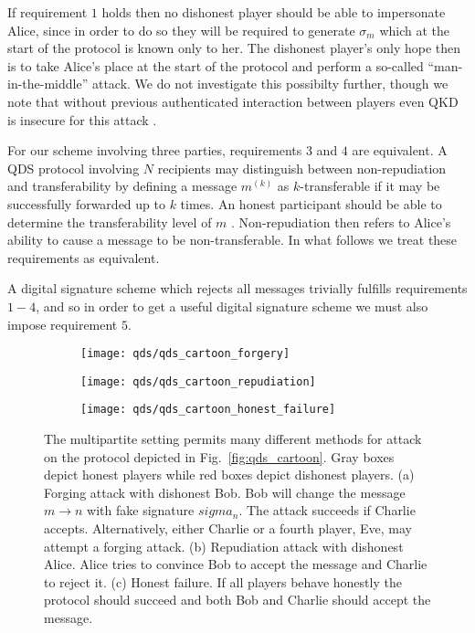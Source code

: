 If requirement $1$ holds then no dishonest player should be able to impersonate Alice, since in order to do so they will be required to generate $\sigma_m$ which at the start of the protocol is known only to her. The dishonest player's only hope then is to take Alice's place at the start of the protocol and perform a so-called ``man-in-the-middle'' attack. We do not investigate this possibilty further, though we note that without previous authenticated interaction between players even QKD is insecure for this attack \cite{Broadbent2015}.

For our scheme involving three parties, requirements $3$ and $4$ are equivalent. A QDS protocol involving $N$ recipients may distinguish between non-repudiation and transferability by defining a message $m^{\left(k\right)}$ as $k$-transferable if it may be successfully forwarded up to $k$ times. An honest participant should be able to determine the transferability level of $m$ \cite{Arrazola2016}. Non-repudiation then refers to Alice's ability to cause a message to be non-transferable. In what follows we treat these requirements as equivalent.

A digital signature scheme which rejects all messages trivially fulfills requirements $1-4$, and so in order to get a useful digital signature scheme we must also impose requirement $5$.

\begin{figure}[htp]
\centering
	\begin{subfigure}{\linewidth}
		\centering
		\texttt{[image: qds/qds\_cartoon\_forgery]}
		\caption{\label{fig:attacks_forgery}}
	\end{subfigure}
	\begin{subfigure}{\linewidth}
		\centering
		\texttt{[image: qds/qds\_cartoon\_repudiation]}
		\caption{\label{fig:attacks_repudiation}}
	\end{subfigure}
	\begin{subfigure}{\linewidth}
		\centering
		\texttt{[image: qds/qds\_cartoon\_honest\_failure]}
		\caption{\label{fig:attacks_robustness}}
	\end{subfigure}
\caption{\label{fig:qds_attacks} The multipartite setting permits many different methods for attack on the protocol depicted in Fig.~\ref{fig:qds_cartoon}. Gray boxes depict honest players while red boxes depict dishonest players. (a) Forging attack with dishonest Bob. Bob will change the message $m \rightarrow n$ with fake signature $sigma_n$. The attack succeeds if Charlie accepts. Alternatively, either Charlie or a fourth player, Eve, may attempt a forging attack. (b) Repudiation attack with dishonest Alice. Alice tries to convince Bob to accept the message and Charlie to reject it. (c) Honest failure. If all players behave honestly the protocol should succeed and both Bob and Charlie should accept the message.}
\end{figure}

